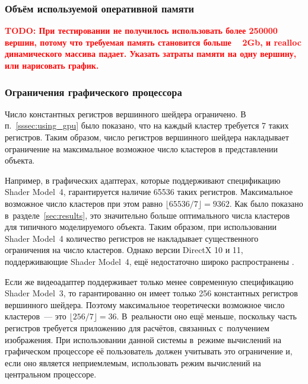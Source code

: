\documentclass[a4paper, 14pt, titlepage]{extarticle}
\newcommand{\todo}[1]{\textbf{\textcolor{red}{TODO: #1}}}
\newcommand{\eng}[1]{{\English #1}}
\begin{document}
      \subsubsection{Объём используемой оперативной памяти}

        \todo{При тестировании не получилось использовать более 250000 вершин, потому что требуемая
        память становится больше ~ 2Gb, и realloc динамического массива падает. Указать затраты
        памяти на одну вершину, или нарисовать график.}

      \subsubsection{Ограничения графического процессора}\label{sssec:gpu_limitations}

        Число константных регистров вершинного шейдера ограничено. В п.~\ref{sssec:using_gpu} было
        показано, что на каждый кластер требуется 7 таких регистров. Таким образом, число регистров
        вершинного шейдера накладывает ограничение на максимальное возможное число кластеров в
        представлении объекта.

        Например, в графических адаптерах, которые поддерживают спецификацию \eng{Shader Model~4},
        гарантируется наличие 65536 таких регистров. Максимальное возможное число
        кластеров при этом равно $\lfloor 65536/7 \rfloor = 9362$. Как было показано
        в~разделе~\ref{sec:results}, это значительно больше оптимального числа кластеров для
        типичного моделируемого объекта. Таким образом, при использовании \eng{Shader Model~4}
        количество регистров не накладывает существенного ограничения на число кластеров. Однако
        версии DirectX 10 и 11, поддерживающие \eng{Shader Model~4}, ещё недостаточно широко
        распространены \cite{steam-hardware}.

        Если же видеоадаптер поддерживает только менее современную спецификацию \eng{Shader
        Model~3}, то гарантированно он имеет только 256 константных регистров вершинного шейдера.
        Поэтому максимальное теоретически возможное число кластеров~--- это $\lfloor 256/7 \rfloor = 36$.
        В~реальности оно ещё меньше, поскольку часть регистров требуется приложению для
        расчётов, связанных с~получением изображения. При использовании данной системы в~режиме
        вычислений на графическом процессоре её пользователь должен учитывать это ограничение и,
        если оно является неприемлемым, использовать режим вычислений на центральном процессоре.
\end{document}
